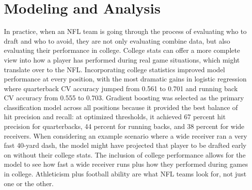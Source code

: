 \documentclass[11pt]{article}
\begin{document}

\section{Modeling and Analysis}

In practice, when an NFL team is going through the process of evaluating who to draft and who to avoid, they are not only evaluating combine data, but also evaluating their performance in college. College stats can offer a more complete view into how a player has performed during real game situations, which might translate over to the NFL. Incorporating college statistics improved model performance at every position, with the most dramatic gains in logistic regression where quarterback CV accuracy jumped from 0.561 to 0.701 and running back CV accuracy from 0.555 to 0.703. Gradient boosting was selected as the primary classification model across all positions because it provided the best balance of hit precision and recall: at optimized thresholds, it achieved 67 percent hit precision for quarterbacks, 44 percent for running backs, and 38 percent for wide receivers. When considering an example scenario where a wide receiver ran a very fast 40-yard dash, the model might have projected that player to be drafted early on without their college stats. The inclusion of college performance allows for the model to see how fast a wide receiver runs plus how they performed during games in college. Athleticism plus football ability are what NFL teams look for, not just one or the other.
\end{document}
